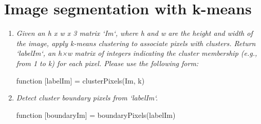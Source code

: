 \documentclass[11pt]{article}
\begin{document}
    \section{Image segmentation with k-means}

    \begin{enumerate}
        \item \textit{Given an h x w x 3 matrix ‘Im‘, where h and w are the height and width of the image, apply
        k-means clustering to associate pixels with clusters. Return ‘labelIm‘, an h×w matrix of integers indicating
        the cluster membership (e.g., from 1 to k) for each pixel.
        Please use the following form:}\newline
        \begin{center}
            function [labelIm] = clusterPixels(Im, k)
        \end{center}

        \item \textit{Detect cluster boundary pixels from ‘labelIm‘.}\newline
        \begin{center}
            function [boundaryIm] = boundaryPixels(labelIm)
        \end{center}


\end{enumerate}
\end{document}
